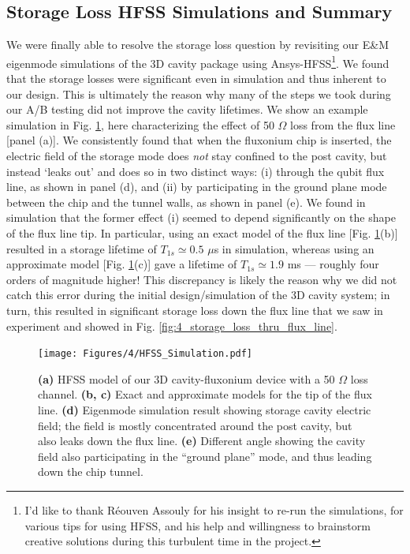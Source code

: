 \subsection{Storage Loss HFSS Simulations and Summary}

We were finally able to resolve the storage loss question by revisiting our E\&M eigenmode simulations of the 3D cavity package using Ansys-HFSS\footnote{I'd like to thank R\'eouven Assouly for his insight to re-run the simulations, for various tips for using HFSS, and his help and willingness to brainstorm creative solutions during this turbulent time in the project.}. We found that the storage losses were significant even in simulation and thus inherent to our design. This is ultimately the reason why many of the steps we took during our A/B testing did not improve the cavity lifetimes. We show an example simulation in Fig. \ref{fig:4_HFSS_Simulation}, here characterizing the effect of 50 $\Omega$ loss from the flux line [panel (a)]. We consistently found that when the fluxonium chip is inserted, the electric field of the storage mode does \textit{not} stay confined to the post cavity, but instead `leaks out' and does so in two distinct ways: (i) through the qubit flux line, as shown in panel (d), and (ii) by participating in the ground plane mode between the chip and the tunnel walls, as shown in panel (e). We found in simulation that the former effect (i) seemed to depend significantly on the shape of the flux line tip. In particular, using an exact model of the flux line [Fig. \ref{fig:4_HFSS_Simulation}(b)] resulted in a storage lifetime of $T_{1s} \simeq 0.5$ $\mu$s in simulation, whereas using an approximate model [Fig. \ref{fig:4_HFSS_Simulation}(c)] gave a lifetime of $T_{1s} \simeq 1.9$ ms --- roughly four orders of magnitude higher! This discrepancy is likely the reason why we did not catch this error during the initial design/simulation of the 3D cavity system; in turn, this resulted in significant storage loss down the flux line that we saw in experiment and showed in Fig. \ref{fig:4_storage_loss_thru_flux_line}.

\begin{figure}[t]
    \centering
    \texttt{[image: Figures/4/HFSS\_Simulation.pdf]}
    \caption{\textbf{(a)} HFSS model of our 3D cavity-fluxonium device with a 50 $\Omega$ loss channel. \textbf{(b, c)} Exact and approximate models for the tip of the flux line. \textbf{(d)} Eigenmode simulation result showing storage cavity electric field; the field is mostly concentrated around the post cavity, but also leaks down the flux line. \textbf{(e)} Different angle showing the cavity field also participating in the ``ground plane'' mode, and thus leading down the chip tunnel.}
    \label{fig:4_HFSS_Simulation}
\end{figure}

